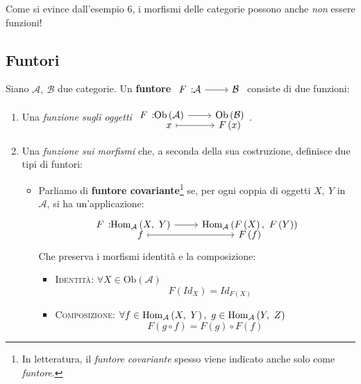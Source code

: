 \begin{attention}
	Come si evince dall'esempio 6, i morfismi delle categorie possono anche \textit{non} essere funzioni!
\end{attention}
\subsection{Funtori}
\begin{define}
Siano $\mathcal{A},\ \mathcal{B}$ due categorie. Un \textbf{funtore} $\funz{F}{\mathcal{A}}{\mathcal{B}}$ consiste di due funzioni:
\begin{enumerate}
	\item Una \textit{funzione sugli oggetti} $\funztot{F}{\mathrm{Ob}\left(\mathcal{A}\right)}{\mathrm{Ob}\left(\mathcal{B}\right)}{x}{F\left(x\right)}$.
	\item Una \textit{funzione sui morfismi} che, a seconda della sua costruzione, definisce due tipi di funtori:
	\begin{itemize}
		\item Parliamo di \textbf{funtore covariante}\footnote{In letteratura, il \textit{funtore covariante} spesso viene indicato anche solo come \textit{funtore}.} se, per ogni coppia di oggetti $X,\ Y$ in $\mathcal{A}$, si ha un'applicazione:
		\begin{equation}
			\funztot{F}{\homo{\mathcal{A}}{X}{Y}}{\homo{\mathcal{A}}{F\left(X\right)}{F\left(Y\right)}}{f}{F\left(f\right)}
		\end{equation}
	Che preserva i morfismi identità e la composizione:
	\begin{itemize}
		\item \textsc{Identità}: $\forall X\in \mathrm{Ob}\left(\mathcal{A}\right)$
		\begin{equation}
			\quad F\left(Id_X\right)=Id_{F\left(X\right)}
		\end{equation}
		\item \textsc{Composizione}: $\forall f\in\homo{\mathcal{A}}{X}{Y},\ g\in\homo{\mathcal{A}}{Y}{Z}$
		\begin{equation}
			F\left(g\circ f\right)=F\left(g\right)\circ F\left(f\right)
		\end{equation}
	\end{itemize}
	\begin{center}
\end{center}
\end{itemize}
\end{enumerate}
\end{define}
